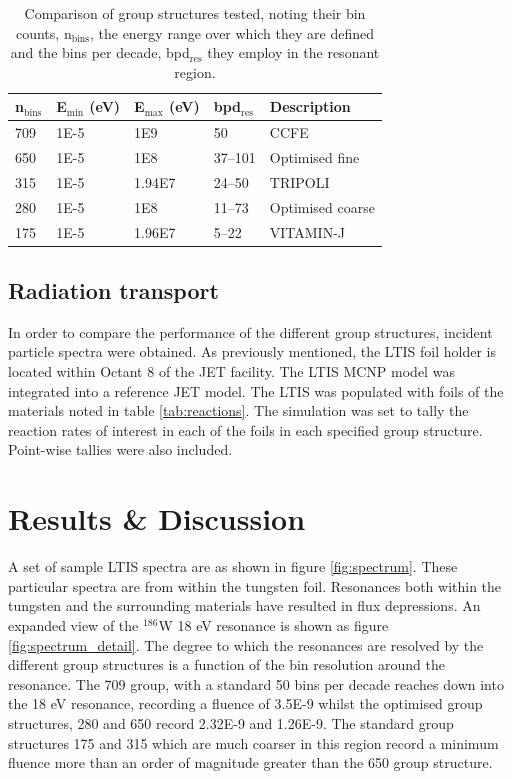 \begin{table}[h!]
  \label{tab:groups}
  \centering
  \begin{tabular}{lllll}
    \toprule
    n$_\mathrm{bins}$ & E$_\mathrm{min}$ (eV) & E$_\mathrm{max}$ (eV) & bpd$_\mathrm{res}$ & Description \\ 
    \midrule
    709 & 1E-5 & 1E9 & 50 & CCFE \\
    650 & 1E-5 & 1E8 & 37--101 & Optimised fine \\
    315 & 1E-5 & 1.94E7 & 24--50 & TRIPOLI  \\
    280 & 1E-5 & 1E8 & 11--73 & Optimised coarse \\ 
    175 & 1E-5 & 1.96E7 & 5--22 & VITAMIN-J \\
    \bottomrule
  \end{tabular}
  \caption{Comparison of group structures tested, noting their bin counts, n$_\mathrm{bins}$, the energy range over which they are defined and the bins per decade, bpd$_\mathrm{res}$ they employ in the resonant region.}
\end{table}

\subsection{Radiation transport}

In order to compare the performance of the different group structures, incident particle spectra were obtained. As previously mentioned, the LTIS foil holder is located within Octant 8 of the JET facility. The LTIS MCNP model \cite{lengar2017} was integrated into a reference JET model. The LTIS was populated with foils of the materials noted in table \ref{tab:reactions}. The simulation was set to tally the reaction rates of interest in each of the foils in each specified group structure. Point-wise tallies were also included.

\section{Results \& Discussion}
\label{sec:results}

A set of sample LTIS spectra are as shown in figure \ref{fig:spectrum}. These particular spectra are from within the tungsten foil. Resonances both within the tungsten and the surrounding materials have resulted in flux depressions. An expanded view of the $^{186}$W 18 eV resonance is shown as figure \ref{fig:spectrum_detail}. The degree to which the resonances are resolved by the different group structures is a function of the bin resolution around the resonance. The 709 group, with a standard 50 bins per decade reaches down into the 18 eV resonance, recording a fluence of 3.5E-9 whilst the optimised group structures, 280 and 650 record 2.32E-9 and 1.26E-9. The standard group structures 175 and 315 which are much coarser in this region record a minimum fluence more than an order of magnitude greater than the 650 group structure.


